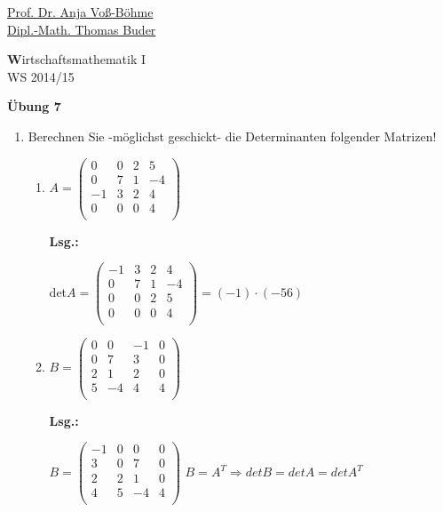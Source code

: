 \documentclass[12pt,a4paper]{scrreprt}
\newcommand{\Lsg}{\textbf{Lsg.:}}
\begin{document}
 
\begin{flushleft}
\href{mailto:anja.voss-boehme@htw-dresden.de}{Prof. Dr. Anja Voß-Böhme} \\
\href{mailto:buder@htw-dresden.de}{Dipl.-Math. Thomas Buder}
\end{flushleft}

\begin{center}{\large\textbf Wirtschaftsmathematik I} \\ WS 2014/15 \end{center}

\begin{center}
\large{\textbf{ Übung 7 }} 
\end{center}

\bigskip
\begin{enumerate}

	\item Berechnen Sie -möglichst geschickt- die Determinanten folgender Matrizen!
	\begin{enumerate}
		\item $A=\begin{pmatrix}
0 & 0 & 2 & 5 \\
0 & 7 & 1 & -4  \\
-1 & 3 & 2 & 4\\
0 & 0 & 0 & 4 \\
\end{pmatrix}$

\Lsg

det$A=\begin{pmatrix}
-1 & 3 & 2 & 4\\
0 & 7 & 1 & -4  \\
0 & 0 & 2 & 5 \\
0 & 0 & 0 & 4 \\
\end{pmatrix}
= (-1) \cdot (-56)$


		\item
$B=\begin{pmatrix}
0 & 0 & -1 & 0 \\
0 & 7 & 3 & 0  \\
2 & 1 & 2 & 0\\
5 & -4 & 4 & 4 \\
\end{pmatrix}$

\Lsg

$B=\begin{pmatrix}
-1 & 0 & 0 & 0 \\
3 & 0 & 7 & 0  \\
2 & 2 & 1 & 0\\
4 & 5 & -4 & 4 \\
\end{pmatrix}$
$B=A^T \Rightarrow det B = det A = det A^T$


\end{enumerate}
\end{enumerate}
\end{document}
